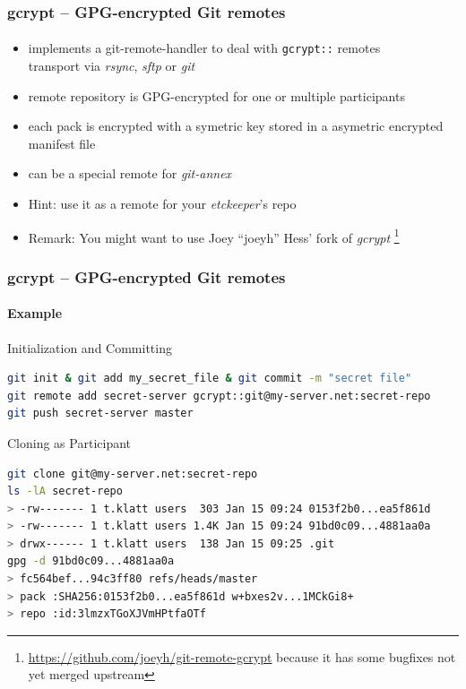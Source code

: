 \documentclass[english,hyperref={pdfpagelabels=false},aspectratio=169]{beamer}
\begin{document}
\begin{frame}[label=gcrypt]
  \frametitle{gcrypt -- GPG-encrypted Git remotes}
  \framesubtitle{}
  \begin{itemize}
    \item implements a git-remote-handler to deal with \texttt{gcrypt::} remotes\\
      {\scriptsize transport via \emph{rsync}, \emph{sftp} or \emph{git}}
    \item remote repository is GPG-encrypted for one or multiple participants
    \item each pack is encrypted with a symetric key stored in a asymetric encrypted manifest file
    \item can be a special remote for \textit{git-annex}
    \item Hint: use it as a remote for your \textit{etckeeper}'s repo
    \item \scriptsize\color{fzjgray50}Remark: You might want to use Joey ``joeyh'' Hess' fork of \emph{gcrypt}
      \footnote{\tiny\url{https://github.com/joeyh/git-remote-gcrypt} because it has some bugfixes not yet merged upstream}
  \end{itemize}
\end{frame}

\begin{frame}[fragile]
  \frametitle{gcrypt -- GPG-encrypted Git remotes}
  \framesubtitle{Example}
  \begin{block}{Initialization and Committing}
    \vspace{-0.75em}
    \begin{lstlisting}[language=zsh]
git init & git add my_secret_file & git commit -m "secret file"
git remote add secret-server gcrypt::git@my-server.net:secret-repo
git push secret-server master
    \end{lstlisting}
    \vspace{-0.75em}
  \end{block}
  \begin{block}{Cloning as Participant}
    \vspace{-0.75em}
    \begin{lstlisting}[language=zsh]
git clone git@my-server.net:secret-repo
ls -lA secret-repo
> -rw------- 1 t.klatt users  303 Jan 15 09:24 0153f2b0...ea5f861d
> -rw------- 1 t.klatt users 1.4K Jan 15 09:24 91bd0c09...4881aa0a
> drwx------ 1 t.klatt users  138 Jan 15 09:25 .git
gpg -d 91bd0c09...4881aa0a
> fc564bef...94c3ff80 refs/heads/master
> pack :SHA256:0153f2b0...ea5f861d w+bxes2v...1MCkGi8+
> repo :id:3lmzxTGoXJVmHPtfaOTf
    \end{lstlisting}
    \vspace{-0.75em}
  \end{block}
\end{frame}
\end{document}
